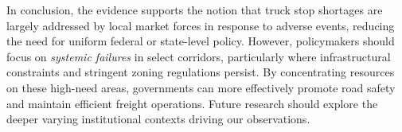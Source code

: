 \documentclass[
  8pt,
  12pt]{article}
\begin{document}
In conclusion, the evidence supports the notion that truck stop
shortages are largely addressed by local market forces in response to
adverse events, reducing the need for uniform federal or state-level
policy. However, policymakers should focus on \emph{systemic failures}
in select corridors, particularly where infrastructural constraints and
stringent zoning regulations persist. By concentrating resources on
these high-need areas, governments can more effectively promote road
safety and maintain efficient freight operations. Future research should
explore the deeper varying institutional contexts driving our
observations.


  
\end{document}

